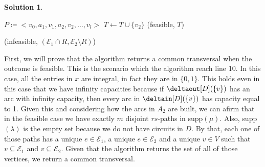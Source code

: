 \documentclass[11pt,leqno,final]{amsart}
\theoremstyle{definition}
\newtheorem{solution}{Solution}
\begin{document}
\begin{solution}
\begin{algorithm}
\begin{algorithmic}[1]
          \State $P \coloneqq <v_0,a_1,v_1,a_2,v_2, \ldots , v_l>$        
          \State $T \gets T \cup \{v_2\}$
        \EndFor
        \State \Return (feasible, $T$)

        \State \Return (infeasible, $(\mathcal{E}_1 \cap R, \mathcal{E}_2 \setminus R)$)  
          
      \EndIf
        
    \end{algorithmic}
  \end{algorithm}

  First, we will prove that the algorithm returns a common transversal when the outcome is feasible. This is the scenario which the algorithm reach line 10. In this case, all the entries in $x$ are integral, in fact they are in $\{0,1\}$. This holds even in this case that we have infinity capacities because if $\deltaout[D](\{v\})$ has an arc with infinity capacity, then every arc in $\deltain[D](\{v\})$ has capacity equal to 1. Given this and considering how the arcs in $A_2$ are built, we can afirm that in the feasible case we have exactly $m$ disjoint $rs$-paths in supp$(\mu)$. Also, supp$(\lambda)$ is the empty set because we do not have circuits in $D$. By that, each one of those paths has a unique $e \in \mathcal{E}_1$, a unique $e \in \mathcal{E}_2$ and a unique $v \in V$ such that $v \subseteq \mathcal{E}_1$ and $v \subseteq \mathcal{E}_2$. Given that the algorithm returns the set of all of those vertices, we return a common transversal.
  


\end{solution}
\end{document}
